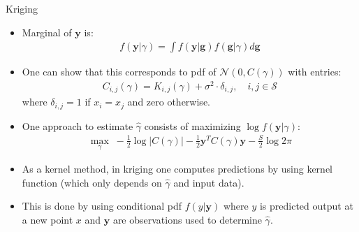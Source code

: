 \documentclass[handout,9pt]{beamer}
\begin{document}
\begin{frame}{Kriging}

\begin{itemize}
   \setlength{\itemsep}{10pt}
\item Marginal of $\mathbf{y}$ is:
\begin{align*}
f(\mathbf{y}|\gamma)=\int f(\mathbf{y}|\mathbf{g})f(\mathbf{g}|\gamma)d\mathbf{g}
\end{align*}
\item One can show that this corresponds to pdf of $\mathcal{N}(0,C(\gamma))$ with entries:
\begin{align*}
C_{i,j}(\gamma)=K_{i,j}(\gamma)+\sigma^2\cdot  \delta_{i,j},\quad i,j\in \mathcal{S}
\end{align*}
where $\delta_{i,j}=1$ if $x_i=x_j$ and zero otherwise. 

\item One approach to estimate $\hat{\gamma}$ consists of maximizing $\log f(\mathbf{y}|\gamma)$:
\begin{align*}
\max_\gamma \; -\frac{1}{2}\log|C(\gamma)|-\frac{1}{2}\mathbf{y}^TC(\gamma)\mathbf{y}-\frac{S}{2}\log 2\pi
\end{align*}

\item As a kernel method, in kriging one computes predictions by using kernel function (which only depends on $\hat{\gamma}$ and input data).

\item This is done by using conditional pdf $f(y|\mathbf{y})$  where $y$ is predicted output at a new point $x$ and $\mathbf{y}$ are observations used to determine $\hat{\gamma}$.

\end{itemize}


\end{frame}

\end{document}
